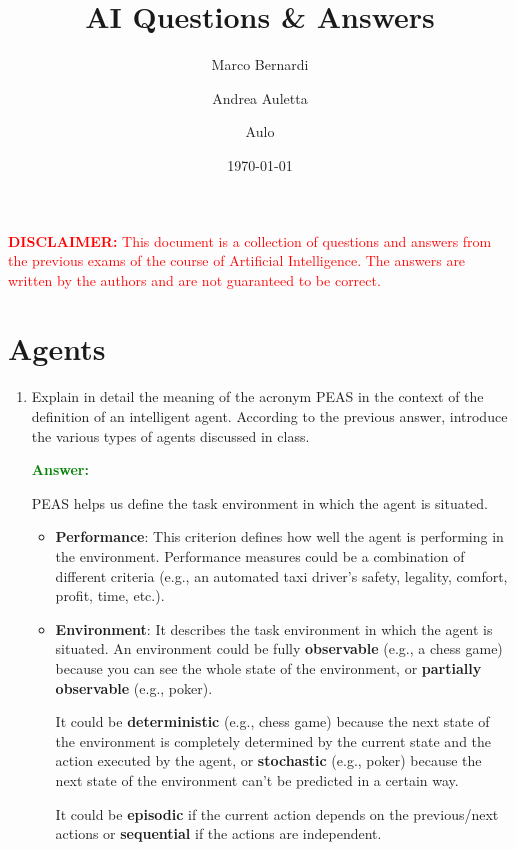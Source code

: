 \documentclass[12pt]{article}
\title{AI Questions \& Answers}
\author{
    Marco Bernardi
    \and
    Andrea Auletta
    \and
    Aulo
}
\date{\today}
\begin{document}
\maketitle
\newpage
\textcolor{red}
{\textbf{DISCLAIMER:} This document is a collection of questions and answers from the previous exams of the course of Artificial Intelligence.
    The answers are written by the authors and are not guaranteed to be correct.}
\newpage

\section{Agents}
\begin{enumerate}[label=\textbf{A.\arabic*}]
    \item Explain in detail the meaning of the acronym PEAS in the context of the definition of an intelligent agent.
          According to the previous answer, introduce the various types of agents discussed in class.

          \textcolor{green}{\textbf{Answer:}}

          PEAS helps us define the task environment in which the agent is situated.

          \begin{itemize}
              \item \textbf{Performance}: This criterion defines how well the agent is performing in the environment. Performance measures could be a combination of different criteria (e.g., an automated taxi driver's safety, legality, comfort, profit, time, etc.).

              \item \textbf{Environment}: It describes the task environment in which the agent is situated. An environment could be fully \textbf{observable} (e.g., a chess game) because you can see the whole state of the environment, or \textbf{partially observable} (e.g., poker).

                    It could be \textbf{deterministic} (e.g., chess game) because the next state of the environment is completely determined by the current state and the action executed by the agent, or \textbf{stochastic} (e.g., poker) because the next state of the environment can't be predicted in a certain way.

                    It could be \textbf{episodic} if the current action depends on the previous/next actions or \textbf{sequential} if the actions are independent.


\end{itemize}
\end{enumerate}
\end{document}
